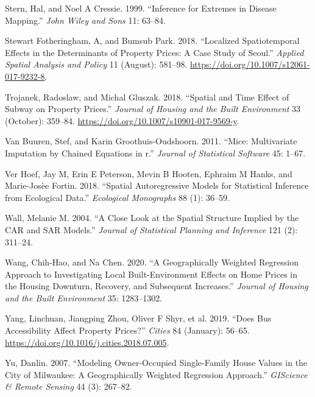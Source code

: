 \documentclass[
  default,
]{sn-jnl}
\newlength{\cslhangindent}
\newenvironment{CSLReferences}[2] %
 {\begin{list}{}{%
  \setlength{\itemindent}{0pt}
  \setlength{\leftmargin}{0pt}
  \setlength{\parsep}{0pt}
  \ifodd #1
   \setlength{\leftmargin}{\cslhangindent}
   \setlength{\itemindent}{-1\cslhangindent}
  \fi
  \setlength{\itemsep}{#2\baselineskip}}}
 {\end{list}}
\begin{document}
\begin{CSLReferences}{1}{0}
Stern, Hal, and Noel A Cressie. 1999. {``Inference for Extremes in
Disease Mapping.''} \emph{John Wiley and Sons} 11: 63--84.

Stewart Fotheringham, A, and Bumsub Park. 2018. {``Localized
Spatiotemporal Effects in the Determinants of Property Prices: A Case
Study of Seoul.''} \emph{Applied Spatial Analysis and Policy} 11
(August): 581--98. \url{https://doi.org/10.1007/s12061-017-9232-8}.

Trojanek, Radoslaw, and Michal Gluszak. 2018. {``Spatial and Time Effect
of Subway on Property Prices.''} \emph{Journal of Housing and the Built
Environment} 33 (October): 359--84.
\url{https://doi.org/10.1007/s10901-017-9569-y}.

Van Buuren, Stef, and Karin Groothuis-Oudshoorn. 2011. {``Mice:
Multivariate Imputation by Chained Equations in r.''} \emph{Journal of
Statistical Software} 45: 1--67.

Ver Hoef, Jay M, Erin E Peterson, Mevin B Hooten, Ephraim M Hanks, and
Marie-Josèe Fortin. 2018. {``Spatial Autoregressive Models for
Statistical Inference from Ecological Data.''} \emph{Ecological
Monographs} 88 (1): 36--59.

Wall, Melanie M. 2004. {``A Close Look at the Spatial Structure Implied
by the CAR and SAR Models.''} \emph{Journal of Statistical Planning and
Inference} 121 (2): 311--24.

Wang, Chih-Hao, and Na Chen. 2020. {``A Geographically Weighted
Regression Approach to Investigating Local Built-Environment Effects on
Home Prices in the Housing Downturn, Recovery, and Subsequent
Increases.''} \emph{Journal of Housing and the Built Environment} 35:
1283--1302.

Yang, Linchuan, Jiangping Zhou, Oliver F Shyr, et al. 2019. {``Does Bus
Accessibility Affect Property Prices?''} \emph{Cities} 84 (January):
56--65. \url{https://doi.org/10.1016/j.cities.2018.07.005}.

Yu, Danlin. 2007. {``Modeling Owner-Occupied Single-Family House Values
in the City of Milwaukee: A Geographically Weighted Regression
Approach.''} \emph{GIScience \& Remote Sensing} 44 (3): 267--82.

\end{CSLReferences}
\end{document}
